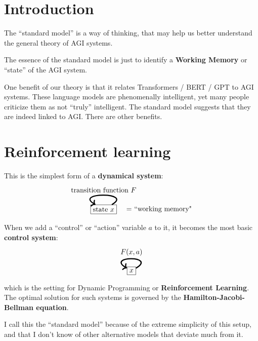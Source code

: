 
\setcounter{section}{-1}
\section{Introduction}

The ``standard model'' is a way of thinking, that may help us better understand the general theory of AGI systems.

The essence of the standard model is just to identify a \textbf{Working Memory} or ``state'' of the AGI system.

One benefit of our theory is that it relates Transformers / BERT / GPT to AGI systems.  These language models are phenomenally intelligent, yet many people criticize them as not ``truly'' intelligent.  The standard model suggests that they are indeed linked to AGI.  There are other benefits.

\section{Reinforcement learning}

This is the simplest form of a \textbf{dynamical system}:
\begin{equation}
\begin{tikzpicture}[->]
\node[rectangle,draw,label=0:{{$\quad =$} ``working memory"}] (C) {state $x$};
\path (C) edge [out=30,in=150,looseness=4,ultra thick] node [above] {transition function $F$} (C);
\end{tikzpicture}
\end{equation}
When we add a ``control'' or ``action'' variable $a$ to it, it becomes the most basic  \textbf{control system}:
\begin{equation}
\begin{tikzpicture}[->]
\node[rectangle,draw] (C) {$x$};
\path (C) edge [out=30,in=150,looseness=7,ultra thick] node [above] {$F(x, a)$} (C);
\end{tikzpicture}
\end{equation}
which is the setting for Dynamic Programming or \textbf{Reinforcement Learning}.  The optimal solution for such systems is governed by the \textbf{Hamilton-Jacobi-Bellman equation}.

I call this the ``standard model'' because of the extreme simplicity of this setup, and that I don't know of other alternative models that deviate much from it.

